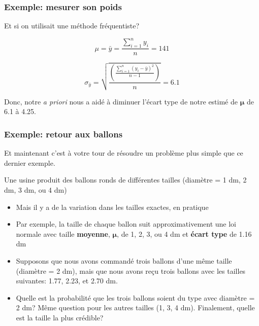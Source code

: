 \documentclass{beamer}
\begin{document}
\begin{frame}
    \frametitle{Exemple: mesurer son poids}
    Et si on utilisait une méthode fréquentiste?

    \pause

    \vfill

    \[\mu = \bar{y} = \frac{\sum_{i=1}^{n} y_i}{n} = 141\]

    \pause

    \vfill

    \[\sigma_{\bar{y}} = \sqrt{\frac{\left(\frac{\sum_{i=1}^{n} (y_i - \bar{y})^2}{n-1}\right)}{n}} = 6.1\]

    \pause

    \vfill

    Donc, notre \emph{a priori} nous a aidé à diminuer l'écart type de notre estimé de $\boldsymbol{\mu}$
    de 6.1 à 4.25.
\end{frame}


\begin{frame}
    \frametitle{Exemple: retour aux ballons}
    Et maintenant c'est à votre tour de résoudre un problème plus simple que ce dernier exemple.

    \pause

    \vfill

    Une usine produit des ballons ronds de différentes tailles (diamètre = 1 dm, 2 dm, 3 dm, ou 4 dm) \pause
    \begin{itemize}
      \item Mais il y a de la variation dans les tailles exactes, en pratique
      \pause
      \item Par exemple, la taille de chaque ballon suit approximativement une loi normale avec
            taille \textbf{moyenne}, $\boldsymbol{\mu}$, de 1, 2, 3, ou 4 dm et \textbf{écart type} de 1.16 dm
      \pause
      \item Supposons que nous avons commandé trois ballons d'une même taille (diamètre = 2 dm),
            mais que nous avons reçu trois ballons avec les tailles suivantes: 1.77, 2.23, et 2.70 dm.
      \pause
      \item Quelle est la probabilité que les trois ballons soient du type avec diamètre = 2 dm?
            Même question pour les autres tailles (1, 3, 4 dm). Finalement, quelle est la
            taille la plus crédible?
    \end{itemize}
\end{frame}
\end{document}
